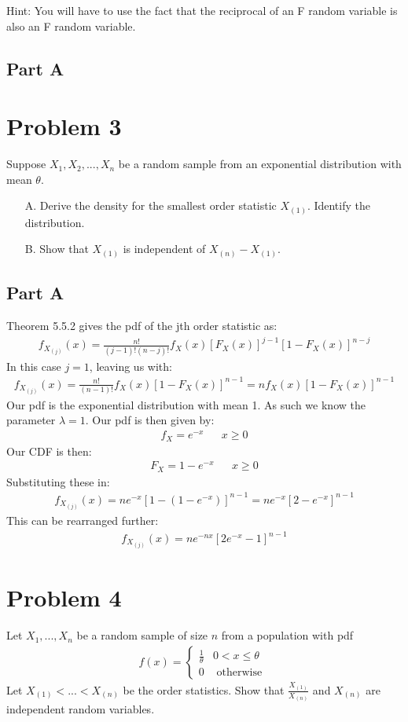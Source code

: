 \documentclass{article}
\begin{document}
Hint: You will have to use the fact that the reciprocal of an F random variable is also an F random
variable.

\subsection*{Part A}

    
\clearpage
\section*{Problem 3}
Suppose $X_1,X_2,...,X_n$ be a random sample from an exponential distribution with mean $\theta$.
\begin{enumerate}
\item[A.] Derive the density for the smallest order statistic $X_{(1)}$. Identify the distribution.
\item[B.] Show that $X_{(1)}$ is independent of $X_{(n)}-X_{(1)}$.
\end{enumerate}
\subsection*{Part A}
Theorem 5.5.2 gives the pdf of the jth order statistic as:
\begin{align*}
f_{X_{(j)}}(x) = \frac{n!}{(j-1)!(n-j)!} f_X(x) [F_X(x)]^{j-1} [1-F_X(x)]^{n-j}
\end{align*}
In this case $j=1$, leaving us with:
\begin{align*}
f_{X_{(j)}}(x) = \frac{n!}{(n-1)!} f_X(x) [1-F_X(x)]^{n-1} = n f_X(x) [1-F_X(x)]^{n-1}
\end{align*}
Our pdf is the exponential distribution with mean 1. As such we know the parameter $\lambda=1$. Our pdf is then given by:\begin{align*}
f_X = e^{-x} && x \geq 0
\end{align*}
Our CDF is then:
\begin{align*}
F_X = 1-e^{-x} && x \geq 0
\end{align*}
Substituting these in:
\begin{align*}
f_{X_{(j)}}(x) = n e^{-x} [1-(1-e^{-x})]^{n-1} = n e^{-x} [2-e^{-x}]^{n-1}
\end{align*}
This can be rearranged further:
\begin{align*}
f_{X_{(j)}}(x) = n e^{-nx} [2e^{-x}-1]^{n-1}
\end{align*}


\clearpage
\section*{Problem 4}
 Let $X_1,...,X_n$ be a random sample of size $n$ from a population with pdf
 \begin{align*}
 f(x) = \begin{cases} 
      \frac{1}{\theta} & 0<x\leq \theta \\
       0 & \text{ otherwise } 
   \end{cases}
\end{align*}
Let $X_{(1)}<...< X_{(n)}$ be the order statistics. Show that $\frac{X_{(1)}}{X_{(n)}}$ and $X_{(n)}$ are independent
random variables.
\end{document}
